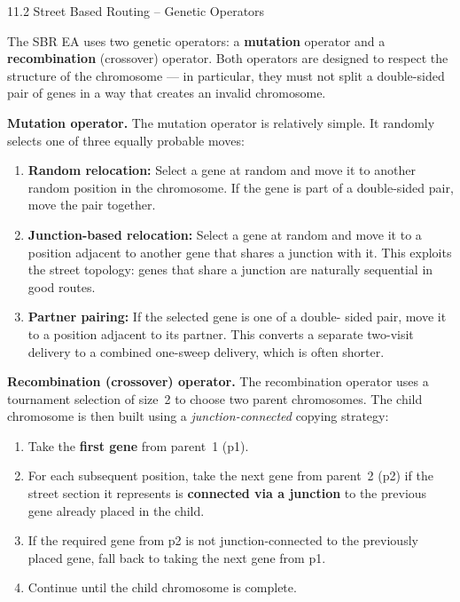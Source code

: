 \documentclass[aspectratio=169,10pt]{beamer}
\begin{document}
\begin{frame}[allowframebreaks]{11.2 Street Based Routing -- Genetic Operators}

  The SBR EA uses two genetic operators: a \textbf{mutation} operator and a
  \textbf{recombination} (crossover) operator.  Both operators are designed
  to respect the structure of the chromosome --- in particular, they must
  not split a double-sided pair of genes in a way that creates an invalid
  chromosome.

  \bigskip
  \textbf{Mutation operator.}
  The mutation operator is relatively simple.  It randomly selects one of
  three equally probable moves:
  \begin{enumerate}
    \item \textbf{Random relocation:} Select a gene at random and move it
          to another random position in the chromosome.  If the gene is part
          of a double-sided pair, move the pair together.
    \item \textbf{Junction-based relocation:} Select a gene at random and
          move it to a position adjacent to another gene that shares a junction
          with it.  This exploits the street topology: genes that share a
          junction are naturally sequential in good routes.
    \item \textbf{Partner pairing:} If the selected gene is one of a double-
          sided pair, move it to a position adjacent to its partner.  This
          converts a separate two-visit delivery to a combined one-sweep
          delivery, which is often shorter.
  \end{enumerate}

  \framebreak

  \textbf{Recombination (crossover) operator.}
  The recombination operator uses a tournament selection of size~2 to choose
  two parent chromosomes.  The child chromosome is then built using a
  \emph{junction-connected} copying strategy:

  \begin{enumerate}
    \item Take the \textbf{first gene} from parent~1 (p1).
    \item For each subsequent position, take the next gene from parent~2 (p2)
          if the street section it represents is \textbf{connected via a
          junction} to the previous gene already placed in the child.
    \item If the required gene from p2 is not junction-connected to the
          previously placed gene, fall back to taking the next gene from p1.
    \item Continue until the child chromosome is complete.
  \end{enumerate}


\end{frame}
\end{document}
